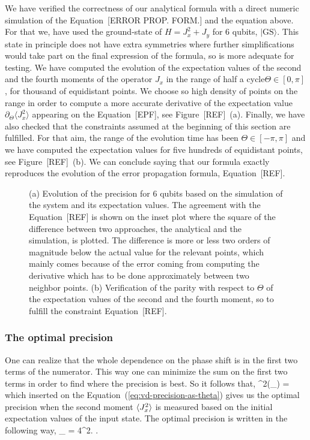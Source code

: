 {We have verified the correctness of our analytical formula with a direct numeric simulation of the Equation~[ERROR PROP. FORM.] and the equation above.
For that we, have used the ground-state of $H=J_x^2+J_y$ for 6 qubits, $|\text{GS}\rangle$.
This state in principle does not have extra symmetries where further simplifications would take part on the final expression of the formula, so is more adequate for testing.
We have computed the evolution of the expectation values of the second and the fourth moments of the operator $J_x$ in the range of half a cycle\ie $\Theta \in [0,\pi]$, for thousand of equidistant points.
We choose so high density of points on the range in order to compute a more accurate derivative of the expectation value $\partial_{\Theta} \langle J_x^2\rangle$ appearing on the Equation~[EPF], see Figure~[REF]~(a).
Finally, we have also checked that the constraints assumed at the beginning of this section are fulfilled.
For that aim, the range of the evolution time has been $\Theta \in [-\pi,\pi]$ and we have computed the expectation values for five hundreds of equidistant points, see Figure~[REF]~(b).
We can conclude saying that our formula exactly reproduces the evolution of the error propagation formula, Equation~[REF].
\begin{figure}
  \centering
  \caption{(a) Evolution of the precision for 6 qubits based on the simulation of the system and its expectation values.
  The agreement with the Equation~[REF] is shown on the inset plot where the square of the difference between two approaches, the analytical and the simulation, is plotted.
  The difference is more or less two orders of magnitude below the actual value for the relevant points, which mainly comes because of the error coming from computing the derivative which has to be done approximately between two neighbor points.
  (b) Verification of the parity with respect to $\Theta$ of the expectation values of the second and the fourth moment, so to fulfill the constraint Equation~[REF].}
  \label{fig:bg-histograms}
\end{figure}


\subsubsection{The optimal precision}
One can realize that the whole dependence on the phase shift is in the first two terms of the numerator.
This way one can minimize the sum on the first two terms in order to find where the precision is best.
So it follows that,
\be
  \tan^2(\Theta_{}) = 
\ee
which inserted on the Equation~{(\ref{eq:vd-precision-as-theta})} gives us the optimal precision when the second moment $\langle J_x^2 \rangle$ is measured based on the initial expectation values of the input state. The optimal precision is written in the following way,
\be
  \varian{\Theta}_{} = 
  {4^2}.
  \label{eq:vd-precision}
\ee.

}
